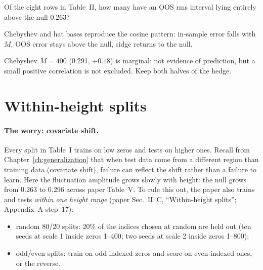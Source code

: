 \begin{checkpoint}
Of the eight rows in Table~II, how many have an OOS rms interval lying entirely above the null 0.263?
\end{checkpoint}

\begin{keyideas}
\item Chebyshev and hat bases reproduce the cosine pattern: in-sample error falls with $M$, OOS error stays above the null, ridge returns to the null.
\item Chebyshev $M=400$ (0.291, $+0.18$) is marginal: not evidence of prediction, but a small positive correlation is not excluded. Keep both halves of the hedge.
\end{keyideas}

\section{Within-height splits}\label{sec:paper-memorization-within}

\paragraph{The worry: covariate shift.} Every split in Table~I trains on low zeros and tests on higher ones. Recall from Chapter~\ref{ch:generalization} that when test data come from a different region than training data (covariate shift), failure can reflect the shift rather than a failure to learn. Here the fluctuation amplitude grows slowly with height: the null grows from 0.263 to 0.296 across paper Table~V. To rule this out, the paper also trains and tests \emph{within one height range} (paper Sec.~II~C, ``Within-height splits''; Appendix~A step~17):
\begin{itemize}
\item random 80/20 splits: 20\% of the indices chosen at random are held out (ten seeds at scale 1 inside zeros 1--400; two seeds at scale 2 inside zeros 1--800);
\item odd/even splits: train on odd-indexed zeros and score on even-indexed ones, or the reverse.
\end{itemize}

